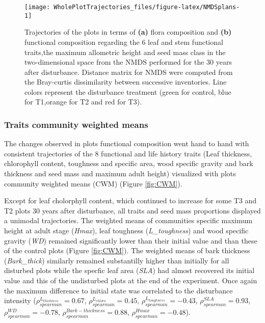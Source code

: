 \documentclass[fleqn,10pt]{ArtEcoFoG} %
\theoremstyle{definition}
\theoremstyle{definition}
\theoremstyle{definition}
\theoremstyle{remark}
\begin{document}
\begin{figure}

{\centering \texttt{[image: WholePlotTrajectories\_files/figure-latex/NMDSplans-1]} 

}

\caption{Trajectories of the plots in terms of \textbf{(a)} flora composition and \textbf{(b)} functional composition regarding the 6 leaf and stem functional traits,the maximum allometric height and seed mass class in the two-dimensional space from the NMDS performed for the 30 years after disturbance. Distance matrix for NMDS were computed from the Bray-curtis dissimilarity between successive inventories. Line colors represent the disturbance treatment (green for control, blue for T1,orange for T2 and red for T3).}\label{fig:NMDSplans}
\end{figure}

\subsubsection{Traits community weighted
means}\label{traits-community-weighted-means}

The changes observed in plots functional composition went hand to hand
with consistent trajectories of the 8 functional and life history traits
(Leaf thickness, chlorophyll content, toughness and specific area, wood
specific gravity and bark thickness and seed mass and maximum adult
height) visualized with plots community weighted means (CWM) (Figure
\ref{fig:CWM}).

Except for leaf cholorphyll content, which continued to increase for
some T3 and T2 plots 30 years after disturbance, all traits and seed
mass proportions displayed a unimodal trajectories. The weighted means
of communities specific maximum height at adult stage (\emph{Hmax}),
leaf toughness (\emph{L\_toughness}) and wood specific gravity
(\emph{WD}) remained significantly lower than their initial value and
than these of the control plots (Figure \ref{fig:CWM}). The weighted
means of bark thickness (\emph{Bark\_thick}) similarly remained
substantilly higher than initially for all disturbed plots while the
specfic leaf area (\emph{SLA}) had almost recovered its initial value
and this of the undisturbed plots at the end of the experiment. Once
again the maximum difference to initial state was correlated to the
disturbance intensity (\(\rho_{spearman}^{L_{thickness}}=0.67\),
\(\rho_{spearman}^{L_{chloro}}=0.45\),
\(\rho_{spearman}^{L_{toughness}}=-0.43\),
\(\rho_{spearman}^{SLA}=0.93\), \(\rho_{spearman}^{WD}=-0.78\),
\(\rho_{spearman}^{Bark-thickness}=0.88\),
\(\rho_{spearman}^{Hmax}=-0.48\)).
\end{document}

